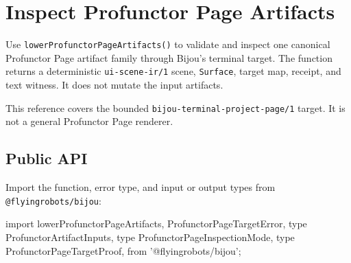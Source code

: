 \chapter{Inspect Profunctor Page Artifacts}\label{record-025}

\smallskip

Use \texttt{l\allowbreak{}o\allowbreak{}w\allowbreak{}e\allowbreak{}r\allowbreak{}P\allowbreak{}r\allowbreak{}o\allowbreak{}f\allowbreak{}u\allowbreak{}n\allowbreak{}c\allowbreak{}t\allowbreak{}o\allowbreak{}r\allowbreak{}P\allowbreak{}a\allowbreak{}g\allowbreak{}e\allowbreak{}A\allowbreak{}r\allowbreak{}t\allowbreak{}i\allowbreak{}f\allowbreak{}a\allowbreak{}c\allowbreak{}t\allowbreak{}s\allowbreak{}(\allowbreak{})} to validate and inspect one canonical Profunctor Page artifact family through Bijou's terminal target. The function returns a deterministic \texttt{u\allowbreak{}i\allowbreak{}-\allowbreak{}s\allowbreak{}c\allowbreak{}e\allowbreak{}n\allowbreak{}e\allowbreak{}-\allowbreak{}i\allowbreak{}r\allowbreak{}/\allowbreak{}1} scene, \texttt{S\allowbreak{}u\allowbreak{}r\allowbreak{}f\allowbreak{}a\allowbreak{}c\allowbreak{}e}, target map, receipt, and text witness. It does not mutate the input artifacts.

This reference covers the bounded \texttt{b\allowbreak{}i\allowbreak{}j\allowbreak{}o\allowbreak{}u\allowbreak{}-\allowbreak{}t\allowbreak{}e\allowbreak{}r\allowbreak{}m\allowbreak{}i\allowbreak{}n\allowbreak{}a\allowbreak{}l\allowbreak{}-\allowbreak{}p\allowbreak{}r\allowbreak{}o\allowbreak{}j\allowbreak{}e\allowbreak{}c\allowbreak{}t\allowbreak{}-\allowbreak{}p\allowbreak{}a\allowbreak{}g\allowbreak{}e\allowbreak{}/\allowbreak{}1} target. It is not a general Profunctor Page renderer.

\section{Public API}\label{record-025-public-api}

Import the function, error type, and input or output types from \texttt{@\allowbreak{}f\allowbreak{}l\allowbreak{}y\allowbreak{}i\allowbreak{}n\allowbreak{}g\allowbreak{}r\allowbreak{}o\allowbreak{}b\allowbreak{}o\allowbreak{}t\allowbreak{}s\allowbreak{}/\allowbreak{}b\allowbreak{}i\allowbreak{}j\allowbreak{}o\allowbreak{}u}:

\begin{CodeBlock}
import {
  lowerProfunctorPageArtifacts,
  ProfunctorPageTargetError,
  type ProfunctorArtifactInputs,
  type ProfunctorPageInspectionMode,
  type ProfunctorPageTargetProof,
} from '@flyingrobots/bijou';
\end{CodeBlock}

